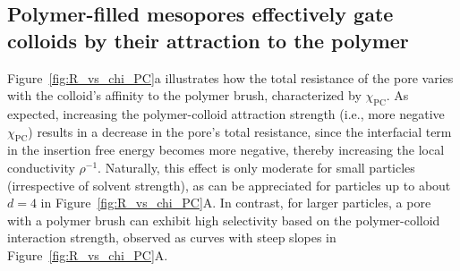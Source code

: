 \documentclass[12pt, a4paper]{article}
\begin{document}


\subsection{Polymer-filled mesopores effectively gate colloids by their attraction to the polymer}


Figure~\ref{fig:R_vs_chi_PC}a illustrates how the total resistance of the pore varies with the colloid's affinity to the polymer brush, characterized by $\chi_{\text{PC}}$.
As expected, increasing the polymer-colloid attraction strength (i.e., more negative $\chi_{\text{PC}}$) results in a decrease in the pore's total resistance, since the interfacial term in the insertion free energy becomes more negative, thereby increasing the local conductivity $\rho^{-1}$.
Naturally, this effect is only moderate for small particles (irrespective of solvent strength), as can be appreciated for particles up to about $d = 4$ in Figure~\ref{fig:R_vs_chi_PC}A.
In contrast, for larger particles, a pore with a polymer brush can exhibit high selectivity based on the polymer-colloid interaction strength, observed as curves with steep slopes in Figure~\ref{fig:R_vs_chi_PC}A.
\end{document}
